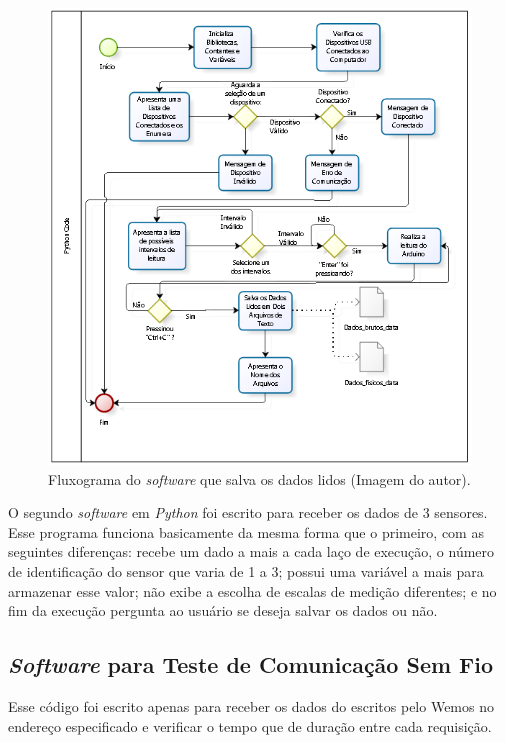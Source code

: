 		\begin{figure}[h!]
			\centering
			\includegraphics[keepaspectratio=true,scale=1]{figuras/diagrama_python.PNG}
			\caption{Fluxograma do \textit{software} que salva os dados lidos (Imagem do autor).}
		 
			\label{fluxograma_python}	
		\end{figure}
		
		O segundo \textit{software} em \textit{Python} foi escrito para receber os dados de 3 sensores. Esse programa funciona basicamente da mesma forma que o primeiro, com as seguintes  diferenças:  recebe um dado a mais a cada laço de execução, o número de identificação do sensor que varia de 1 a 3; possui uma variável a mais para  armazenar esse valor; não exibe a escolha de escalas de medição diferentes; e no fim da execução pergunta ao usuário se deseja salvar os dados ou não.

\subsection{\textit{Software} para Teste de Comunicação Sem Fio}

	Esse código foi escrito apenas para receber os dados do escritos pelo Wemos no endereço especificado e verificar o tempo que de duração entre cada requisição.
	
